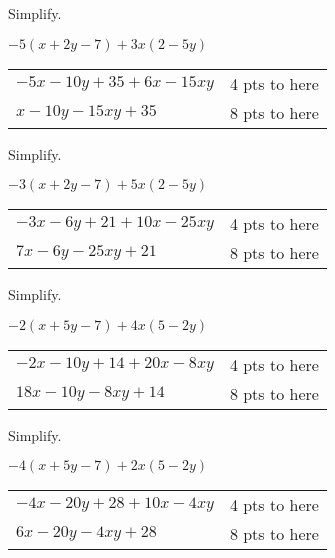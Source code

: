{
	Simplify.
	
	$-5(x+2y-7) + 3x(2 - 5y)$
}
{
	\begin{tabular}{l r}
	$-5x-10y+35+6x-15xy$ & 4 pts to here\\
	$x-10y-15xy+35$ & 8 pts to here
	\end{tabular}
}

{
	Simplify.
	
	$-3(x+2y-7) + 5x(2 - 5y)$
}
{
	\begin{tabular}{l r}
	$-3x-6y+21+10x-25xy$ & 4 pts to here\\
	$7x-6y-25xy+21$ & 8 pts to here
	\end{tabular}
}

{
	Simplify.
	
	$-2(x+5y-7) + 4x(5 - 2y)$
}
{
	\begin{tabular}{l r}
	$-2x-10y+14+20x-8xy$ & 4 pts to here\\
	$18x-10y-8xy+14$ & 8 pts to here
	\end{tabular}
}

{
	Simplify.
	
	$-4(x+5y-7) + 2x(5 - 2y)$
}
{
	\begin{tabular}{l r}
	$-4x-20y+28+10x-4xy$ & 4 pts to here\\
	$6x-20y-4xy+28$ & 8 pts to here
	\end{tabular}
}

